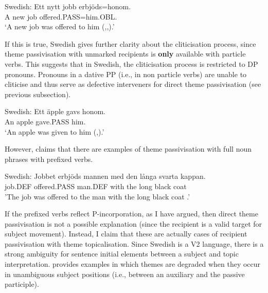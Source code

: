 \begin{exe}
	\ex Swedish:\label{ex:sw-offer-pass}
	\gll Ett nytt jobb erbjöds=honom.\\
A new job offered.PASS=him.OBL.\\
\trans `A new job was offered to him (\citealt{Anward.1989},\citealt{Falk.1990},\citealt{Lundquist.2006}).'
\end{exe}

If this is true, Swedish gives further clarity about the cliticisation process, since theme passivisation with unmarked recipients is \textbf{only} available with particle verbs. This suggests that in Swedish, the cliticisation process is restricted to DP pronouns. Pronouns in a dative PP (i.e., in non particle verbs) are unable to cliticise and thus serve as defective interveners for direct theme passivisation (see previous subsection).

\begin{exe}
	\ex Swedish:\label{ex:sw-give-pass}
	\gll *Ett äpple gavs honom.\\
	 An apple gave.PASS him.\\
	 \trans `An apple was given to him (\citealt{Anward.1989},\citealt{Lundquist.2006}).'
\end{exe}

However, \cite{Lundquist.2004} claims that there are examples of theme passivisation with full noun phrases with prefixed verbs.

\begin{exe}
	\ex Swedish:\label{ex:sw-offer-thepas}
	\gll Jobbet erbjöds mannen med den långa svarta kappan.\\
	job.DEF offered.PASS man.DEF with the long black coat\\
	'The job was offered to the man with the long black coat \citep[ex 26]{Lundquist.2004}.'
\end{exe}

If the prefixed verbs reflect P-incorporation, as I have argued, then direct theme passivisation is not a possible explanation (since the recipient is a valid target for subject movement). Instead, I claim that these are actually cases of recipient passivisation with theme topicalisation. Since Swedish is a V2 language, there is a strong ambiguity for sentence initial elements between a subject and topic interpretation. \cite{Lundquist.2004} provides examples in which themes are degraded when they occur in unambiguous subject positions (i.e., between an auxiliary and the passive participle).

